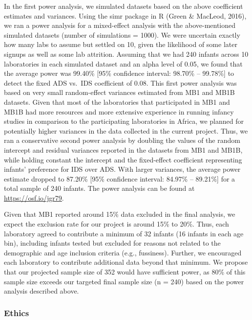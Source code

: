 \documentclass[
  ,man,floatsintext]{apa6}
\begin{document}
In the first power analysis, we simulated datasets based on the above coefficient estimates and variances. Using the simr package in R (Green \& MacLeod, 2016), we ran a power analysis for a mixed-effect analysis with the above-mentioned simulated datasets (number of simulations = 1000). We were uncertain exactly how many labs to assume but settled on 10, given the likelihood of some later signups as well as some lab attrition. Assuming that we had 240 infants across 10 laboratories in each simulated dataset and an alpha level of 0.05, we found that the average power was 99.40\% {[}95\% confidence interval: 98.70\% -- 99.78\%{]} to detect the fixed ADS vs.~IDS coefficient of 0.08. This first power analysis was based on very small random-effect variances estimated from MB1 and MB1B datasets. Given that most of the laboratories that participated in MB1 and MB1B had more resources and more extensive experience in running infancy studies in comparison to the participating laboratories in Africa, we planned for potentially higher variances in the data collected in the current project. Thus, we ran a conservative second power analysis by doubling the values of the random intercept and residual variances reported in the datasets from MB1 and MB1B, while holding constant the intercept and the fixed-effect coefficient representing infants' preference for IDS over ADS. With larger variances, the average power estimate dropped to 87.20\% {[}95\% confidence interval: 84.97\% -- 89.21\%{]} for a total sample of 240 infants. The power analysis can be found at \href{}{https://osf.io/jgr79}.

Given that MB1 reported around 15\% data excluded in the final analysis, we expect the exclusion rate for our project is around 15\% to 20\%. Thus, each laboratory agreed to contribute a minimum of 32 infants (16 infants in each age bin), including infants tested but excluded for reasons not related to the demographic and age inclusion criteria (e.g., fussiness). Further, we encouraged each laboratory to contribute additional data beyond that minimum. We propose that our projected sample size of 352 would have sufficient power, as 80\% of this sample size exceeds our targeted final sample size (n = 240) based on the power analysis described above.

\hypertarget{ethics}{%
\subsubsection{Ethics}\label{ethics}}
\end{document}

